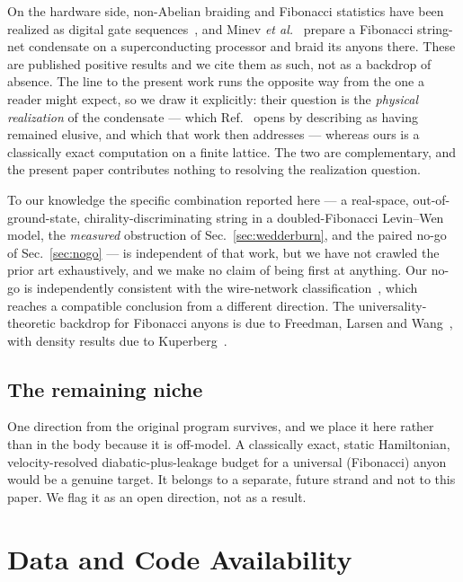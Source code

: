 \documentclass[aps,pra,twocolumn,superscriptaddress,longbibliography,floatfix,nofootinbib]{revtex4-2}
\begin{document}
On the hardware side, non-Abelian braiding and Fibonacci statistics have been
realized as digital gate sequences~\cite{Xu2024,Andersen2023,Iqbal2024}, and
Minev \emph{et al.}~\cite{Minev2025} prepare a Fibonacci string-net condensate
on a superconducting processor and braid its anyons there. These are published
positive results and we cite them as such, not as a backdrop of absence. The
line to the present work runs the opposite way from the one a reader might
expect, so we draw it explicitly: their question is the \emph{physical
realization} of the condensate --- which Ref.~\cite{Minev2025} opens by
describing as having remained elusive, and which that work then addresses ---
whereas ours is a classically exact computation on a finite lattice. The two are
complementary, and the present paper contributes nothing to resolving the
realization question.

To our knowledge the specific combination reported here --- a real-space,
out-of-ground-state, chirality-discriminating string in a doubled-Fibonacci
Levin--Wen model, the \emph{measured} obstruction of
Sec.~\ref{sec:wedderburn}, and the paired no-go of Sec.~\ref{sec:nogo} --- is
independent of that work, but we have not crawled the prior art exhaustively,
and we make no claim of being first at anything. Our no-go is independently
consistent with the wire-network
classification~\cite{ConlonSlingerland2022,Maciazek2023}, which reaches a
compatible conclusion from a different direction. The universality-theoretic
backdrop for Fibonacci anyons is due to Freedman, Larsen and
Wang~\cite{FLW2002}, with density results due to Kuperberg~\cite{Kuperberg2009}.

\subsection{The remaining niche}
\label{sec:niche}

One direction from the original program survives, and we place it here rather
than in the body because it is off-model. A classically exact, static
Hamiltonian, velocity-resolved diabatic-plus-leakage budget for a universal
(Fibonacci) anyon would be a genuine target. It belongs to a separate, future
strand and not to this paper. We flag it as an open direction, not as a
result.

\section*{Data and Code Availability}
\label{sec:data}
\end{document}
